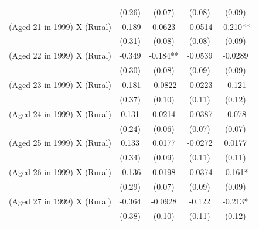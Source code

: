 \documentclass[12pt,letterpaper]{article}
\newcommand{\0}{\ensuremath{\mbox{\boldmath $0$}}}
\begin{document}
{\begin{table}[h!]
\begin{center}
{{\begin{tabular}{lcccc}
                                            & (0.26)                & (0.07)            & (0.08)                & (0.09)            \\
(Aged 21 in 1999) X (Rural)                 & -0.189                & 0.0623            & -0.0514               &  -0.210**         \\
                                            & (0.31)                & (0.08)            & (0.08)                & (0.09)            \\
(Aged 22 in 1999) X (Rural)                 & -0.349                &  -0.184**         & -0.0539               & -0.0289           \\
                                            & (0.30)                & (0.08)            & (0.09)                & (0.09)            \\
(Aged 23 in 1999) X (Rural)                 & -0.181                & -0.0822           & -0.0223               & -0.121            \\
                                            & (0.37)                & (0.10)            & (0.11)                & (0.12)            \\
(Aged 24 in 1999) X (Rural)                 & 0.131                 & 0.0214            & -0.0387               & -0.078            \\
                                            & (0.24)                & (0.06)            & (0.07)                & (0.07)            \\
(Aged 25 in 1999) X (Rural)                 & 0.133                 & 0.0177            & -0.0272               & 0.0177            \\
                                            & (0.34)                & (0.09)            & (0.11)                & (0.11)            \\
(Aged 26 in 1999) X (Rural)                 & -0.136                & 0.0198            & -0.0374               &  -0.161*          \\
                                            & (0.29)                & (0.07)            & (0.09)                & (0.09)            \\
(Aged 27 in 1999) X (Rural)                 & -0.364                & -0.0928           & -0.122                &  -0.213*          \\
                                            & (0.38)                & (0.10)            & (0.11)                & (0.12)            \\

\end{tabular}}}
\end{center}
\end{table}}
\end{document}
